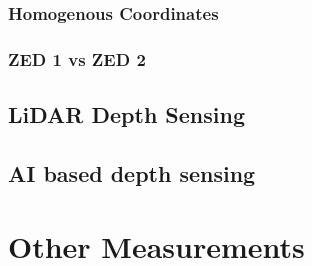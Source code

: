 \subsubsection{Homogenous Coordinates}

\subsubsection{ZED 1 vs ZED 2}

\subsection{LiDAR Depth Sensing}

\subsection{AI based depth sensing}


\section{Other Measurements}


\filbreak